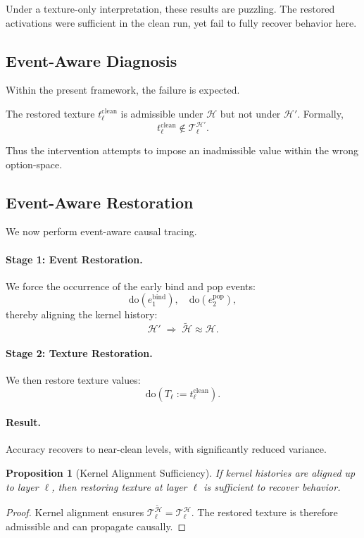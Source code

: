 \documentclass[11pt]{article}
\newtheorem{proposition}{Proposition}
\theoremstyle{remark}
\newcommand{\Hist}{\mathcal{H}}
\newcommand{\Do}{\mathrm{do}}
\begin{document}
Under a texture-only interpretation, these results are puzzling. The
restored activations were sufficient in the clean run, yet fail to
fully recover behavior here.

\subsection{Event-Aware Diagnosis}

Within the present framework, the failure is expected.

The restored texture $t_\ell^{\text{clean}}$ is admissible under
$\Hist$ but not under $\Hist'$. Formally,
\[
t_\ell^{\text{clean}} \notin \mathcal{T}_\ell^{\Hist'}.
\]

Thus the intervention attempts to impose an inadmissible value within
the wrong option-space.

\subsection{Event-Aware Restoration}

We now perform event-aware causal tracing.

\paragraph{Stage 1: Event Restoration.}
We force the occurrence of the early bind and pop events:
\[
\Do(e^{\mathrm{bind}}_1), \quad \Do(e^{\mathrm{pop}}_2),
\]
thereby aligning the kernel history:
\[
\Hist' \;\Rightarrow\; \tilde{\Hist} \approx \Hist.
\]

\paragraph{Stage 2: Texture Restoration.}
We then restore texture values:
\[
\Do(T_\ell := t_\ell^{\text{clean}}).
\]

\paragraph{Result.}
Accuracy recovers to near-clean levels, with significantly reduced
variance.

\begin{proposition}[Kernel Alignment Sufficiency]
If kernel histories are aligned up to layer $\ell$, then restoring
texture at layer $\ell$ is sufficient to recover behavior.
\end{proposition}

\begin{proof}
Kernel alignment ensures
$\mathcal{T}_\ell^{\tilde{\Hist}} = \mathcal{T}_\ell^{\Hist}$. The
restored texture is therefore admissible and can propagate causally.
\end{proof}
\end{document}
